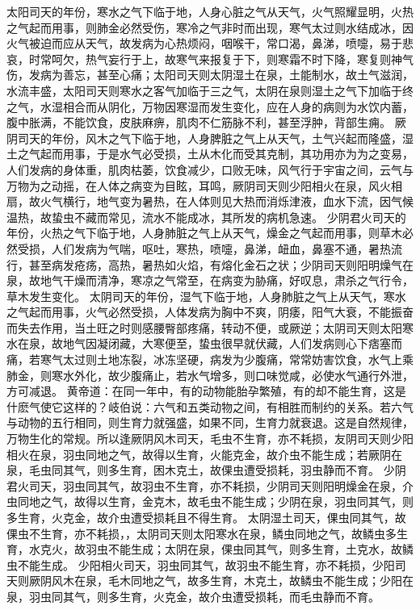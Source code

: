 \documentclass[a4paper,12pt,UTF8,twoside]{ctexbook}
\begin{document}
太阳司天的年份，寒水之气下临于地，人身心脏之气从天气，火气照耀显明，火热之气起而用事，则肺金必然受伤，寒冷之气非时而出现，寒气太过则水结成冰，因火气被迫而应从天气，故发病为心热烦闷，咽喉干，常口渴，鼻涕，喷嚏，易于悲哀，时常呵欠，热气妄行于上，故寒气来报复于下，则寒霜不时下降，寒复则神气伤，发病为善忘，甚至心痛；太阳司天则太阴湿土在泉，土能制水，故土气滋润，水流丰盛，太阳司天则寒水之客气加临于三之气，太阴在泉则湿土之气下加临于终之气，水湿相合而从阴化，万物因寒湿而发生变化，应在人身的病则为水饮内蓄，腹中胀满，不能饮食，皮肤麻痹，肌肉不仁筋脉不利，甚至浮肿，背部生痈。
厥阴司天的年份，风木之气下临于地，人身脾脏之气上从天气，土气兴起而隆盛，湿土之气起而用事，于是水气必受损，土从木化而受其克制，其功用亦为为之变易，人们发病的身体重，肌肉枯萎，饮食减少，口败无味，风气行于宇宙之间，云气与万物为之动摇，在人体之病变为目眩，耳鸣，厥阴司天则少阳相火在泉，风火相扇，故火气横行，地气变为暑热，在人体则见大热而消烁津液，血水下流，因气候温热，故蛰虫不藏而常见，流水不能成冰，其所发的病机急速。
少阴君火司天的年份，火热之气下临于地，人身肺脏之气上从天气，燥金之气起而用事，则草木必然受损，人们发病为气喘，呕吐，寒热，喷嚏，鼻涕，衄血，鼻塞不通，暑热流行，甚至病发疮疡，高热，暑热如火焰，有熔化金石之状；少阴司天则阳明燥气在泉，故地气干燥而清净，寒凉之气常至，在病变为胁痛，好叹息，肃杀之气行令，草木发生变化。
太阴司天的年份，湿气下临于地，人身肺脏之气上从天气，寒水之气起而用事，火气必然受损，人体发病为胸中不爽，阴痿，阳气大衰，不能振奋而失去作用，当土旺之时则感腰臀部疼痛，转动不便，或厥逆；太阴司天则太阳寒水在泉，故地气因凝闭藏，大寒便至，蛰虫很早就伏藏，人们发病则心下痞塞而痛，若寒气太过则土地冻裂，冰冻坚硬，病发为少腹痛，常常妨害饮食，水气上乘肺金，则寒水外化，故少腹痛止，若水气增多，则口味觉咸，必使水气通行外泄，方可减退。
黄帝道：在同一年中，有的动物能胎孕繁殖，有的却不能生育，这是什麽气使它这样的？岐伯说：六气和五类动物之间，有相胜而制约的关系。若六气与动物的五行相同，则生育力就强盛，如果不同，生育力就衰退。这是自然规律，万物生化的常规。所以逢厥阴风木司天，毛虫不生育，亦不耗损，友阴司天则少阳相火在泉，羽虫同地之气，故得以生育，火能克金，故介虫不能生成；若厥阴在泉，毛虫同其气，则多生育，困木克土，故倮虫遭受损耗，羽虫静而不育。
少阴君火司天，羽虫同其气，故羽虫不生育，亦不耗损，少阴司天则阳明燥金在泉，介虫同地之气，故得以生育，金克木，故毛虫不能生成；少阴在泉，羽虫同其气，则多生育，火克金，故介虫遭受损耗且不得生育。
太阴湿土司天，倮虫同其气，故倮虫不生育，亦不耗损，，太阴司天则太阳寒水在泉，鳞虫同地之气，故鳞虫多生育，水克火，故羽虫不能生成；太阴在泉，倮虫同其气，则多生育，土克水，故鳞虫不能生成。
少阳相火司天，羽虫同其气，故羽虫不能生育，亦不耗损，少阳司天则厥阴风木在泉，毛木同地之气，故多生育，木克土，故鳞虫不能生成；少阳在泉，羽虫同其气，则多生育，火克金，故介虫遭受损耗，而毛虫静而不育。
\end{document}
